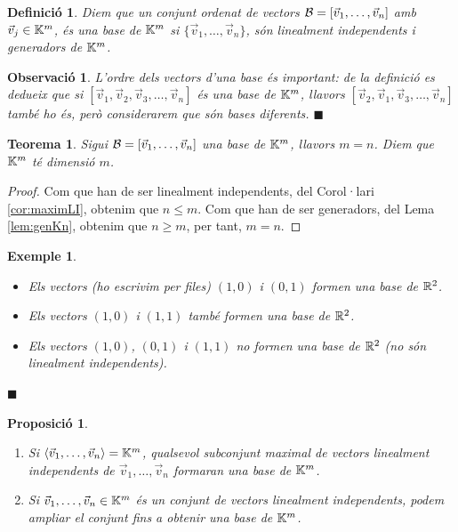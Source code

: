 \documentclass[
  11pt,
]{book}
\numberwithin{dummy}{section}
\theoremstyle{maincolornumbox}
\newtheorem{theorem}{TTTT}[chapter]
\newtheorem{theoremeT}{Teorema}[chapter]
\newtheorem{remarkT}{Observació}[chapter]
\theoremstyle{blacknumex}
\newtheorem{exampleT}{Exemple}[chapter]
\theoremstyle{blacknumbox}
\newtheorem{definitionT}{Definició}[chapter]
\theoremstyle{maincolornum}
\newtheorem{propositionT}{Proposició}[chapter]
\renewenvironment{theorem}{\begin{tBox}\begin{theoremeT}}{\end{theoremeT}\end{tBox}}
\newenvironment{proposition}{\begin{pBox}\begin{propositionT}}{\end{propositionT}\end{pBox}}
\newenvironment{definition}{\begin{dBox}\begin{definitionT}}{\end{definitionT}\end{dBox}}
\newenvironment{example}{\begin{exampleT}}{\hfill{\tiny\ensuremath{\blacksquare}}\end{exampleT}}
\newenvironment{remark}{\begin{remarkT}}{\hfill{\tiny\ensuremath{\blacksquare}}\end{remarkT}}
\begin{document}
\begin{definition}
\protect\hypertarget{def:base}{}\label{def:base}Diem que un conjunt ordenat de vectors
\(\mathcal{B}=[\vec  v_1, \dots, \vec v_n]\) amb \(\vec v_j\in \mathbb{K}^m\), és \emph{una
base de \(\mathbb{K}^m\)} si \(\{\vec v_1,\dots,\vec v_n\}\), són linealment
independents i generadors de \(\mathbb{K}^m\).
\end{definition}

\begin{remark}
L'ordre dels vectors d'una base és important: de la definició es dedueix
que si \([\vec  v_1, \vec v_2, \vec v_3,\dots, \vec v_n]\) és una base de
\(\mathbb{K}^m\), llavors \([\vec  v_2, \vec v_1, \vec v_3,\dots, \vec v_n]\) també
ho és, però considerarem que són bases diferents.
\end{remark}

\begin{theorem}
Sigui \(\mathcal{B}=[\vec v_1, \dots, \vec v_n]\) una base de \(\mathbb{K}^m\), llavors
\(m=n\). Diem que \emph{\(\mathbb{K}^m\) té dimensió \(m\)}.
\end{theorem}

\begin{proof}
Com que han de ser linealment independents, del Corol·lari
\ref{cor:maximLI}, obtenim que \(n\leq m\). Com que han de ser
generadors, del Lema \ref{lem:genKn}, obtenim que \(n\geq m\), per tant, \(m=n\).
\end{proof}

\begin{example}
\leavevmode

\begin{itemize}
\item
  Els vectors (ho escrivim per files) \((1,0)\) i \((0,1)\) formen una
  base de \(\mathbb{R}^2\).
\item
  Els vectors \((1,0)\) i \((1,1)\) també formen una base de \(\mathbb{R}^2\).
\item
  Els vectors \((1,0)\), \((0,1)\) i \((1,1)\) no formen una base de \(\mathbb{R}^2\)
  (no són linealment independents).
\end{itemize}

\end{example}

\begin{proposition}
\leavevmode

\begin{enumerate}
\def\labelenumi{\arabic{enumi}.}
\item
  Si \(\langle \vec v_1, \dots , \vec v_n \rangle = \mathbb{K}^m\), qualsevol
  subconjunt maximal de vectors linealment independents de
  \(\vec v_1, \dots, \vec v_n\) formaran una base de \(\mathbb{K}^m\).
\item
  Si \(\vec v_1, \dots, \vec v_n \in \mathbb{K}^m\) és un conjunt de vectors
  linealment independents, podem ampliar el conjunt fins a obtenir una
  base de \(\mathbb{K}^m\).
\end{enumerate}

\end{proposition}
\end{document}
